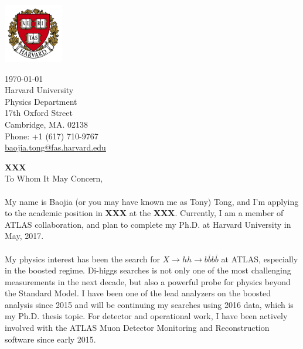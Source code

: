 \documentclass[letterpaper,11pt,oneside]{article}
\begin{document}
\begin{minipage}{.5\textwidth}
  \includegraphics[height=7em]{Harvard}
\end{minipage}
\begin{minipage}{.5\textwidth}
\begin{flushright}
 \today                           \\
 \vspace{1em}                              
 Harvard University            \\
 Physics Department                  \\
 17th Oxford Street                       \\
 Cambridge, MA. 02138   \\
 Phone: +1 (617) 710-9767         \\
\href{mailto:baojia.tong@fas.harvard.edu}{baojia.tong@fas.harvard.edu}  \\ 
\end{flushright}
\end{minipage}

\vspace{2em}
\textbf{XXX}\\
To Whom It May Concern, \\

\onehalfspacing
\paragraph{}
My name is Baojia (or you may have known me as Tony) Tong, and I'm applying to the academic position in \textbf{XXX} at the \textbf{XXX}. Currently, I am a member of ATLAS collaboration, and plan to complete my Ph.D. at Harvard University in May, 2017.

\paragraph{}
My physics interest has been the search for $X \to hh \to b\bar{b}b\bar{b}$ at ATLAS, especially in the boosted regime. Di-higgs searches is not only one of the most challenging measurements in the next decade, but also a powerful probe for physics beyond the Standard Model. I have been one of the lead analyzers on the boosted analysis since 2015 and will be continuing my searches using 2016 data, which is my Ph.D. thesis topic. For detector and operational work, I have been actively involved with the ATLAS Muon Detector Monitoring and Reconstruction software since early 2015.
\end{document}
